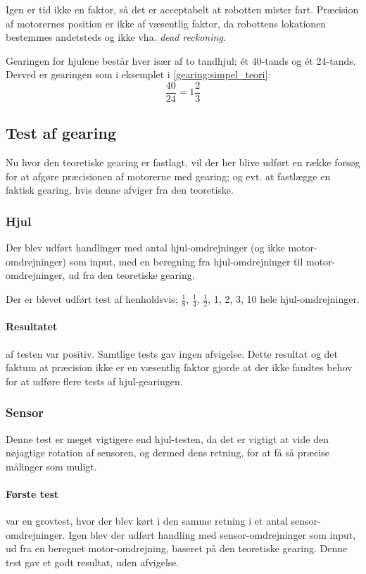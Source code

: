 Igen er tid ikke en faktor, så det er acceptabelt at robotten mister fart.
Præcision af motorernes position er ikke af væsentlig faktor, da robottens lokationen bestemmes andetsteds og ikke vha. \textit{dead reckoning}.

Gearingen for hjulene består hver især af to tandhjul; ét 40-tands og ét 24-tands.
Derved er gearingen som i eksemplet i \cref{gearing:simpel_teori}: $$ \frac{40}{24} = 1 \frac{2}{3} $$

\subsection{Test af gearing}\label{robot:gearing-test}
Nu hvor den teoretiske gearing er fastlagt, vil der her blive udført en række forsøg for at afgøre præcisionen af motorerne med gearing; og evt. at fastlægge en faktisk gearing, hvis denne afviger fra den teoretiske.

\subsubsection{Hjul}
Der blev udført handlinger med antal hjul-omdrejninger (og ikke motor-omdrejninger) som input, med en beregning fra hjul-omdrejninger til motor-omdrejninger, ud fra den teoretiske gearing.

Der er blevet udført test af henholdsvis; $\frac{1}{8}$, $\frac{1}{4}$, $\frac{1}{2}$, 1, 2, 3, 10 hele hjul-omdrejninger.
\paragraph{Resultatet} af testen var positiv.
Samtlige tests gav ingen afvigelse.
Dette resultat og det faktum at præcision ikke er en væsentlig faktor gjorde at der ikke fandtes behov for at udføre flere tests af hjul-gearingen.

\subsubsection{Sensor}
Denne test er meget vigtigere end hjul-testen, da det er vigtigt at vide den nøjagtige rotation af sensoren, og dermed dens retning, for at få så præcise målinger som muligt.

\paragraph{Første test} var en grovtest, hvor der blev kørt i den samme retning i et antal sensor-omdrejninger.
Igen blev der udført handling med sensor-omdrejninger som input, ud fra en beregnet motor-omdrejning, baseret på den teoretiske gearing.
Denne test gav et godt resultat, uden afvigelse.


